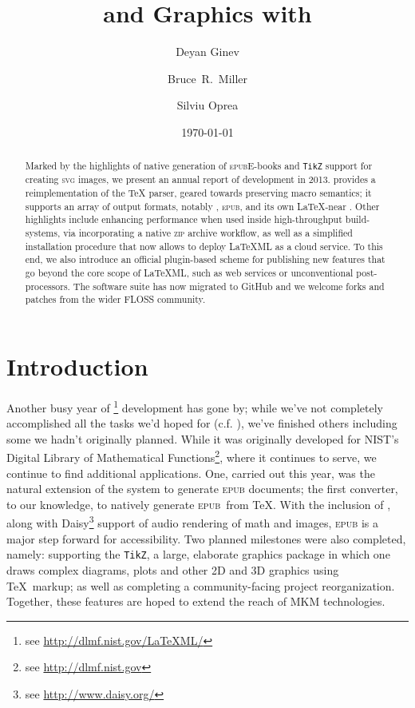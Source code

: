 \documentclass{llncs}
\title{\ebooks and Graphics with \LaTeXML}
\author{Deyan Ginev\inst{1} \and Bruce~R.~Miller\inst{2} \and Silviu Oprea\inst{3}}
\institute{Computer Science, Jacobs University Bremen, Germany
 \and National Institute of Standards and Technology, Gaithersburg, MD, USA
 \and Department of Computer Science, University of Oxford, Oxford, UK}
\date{\today}
\def\ebooks{\mbox{E-books}\xspace}
\def\epub{\textsc{epub}\xspace}
\def\svg{\textsc{svg}\xspace}
\def\zip{\textsc{zip}\xspace}
\def\tikz{\texttt{TikZ}\xspace}
\begin{document}
\maketitle
\begin{abstract} 
Marked by the highlights of native generation of \epub \ebooks and \tikz support for creating \svg images, we present an annual report of {\LaTeXML} development in 2013. {\LaTeXML} provides a reimplementation of the {\TeX} parser, geared towards preserving macro semantics;
it supports an array of output formats, notably , \epub, {\XHTML} and its own \LaTeX-near \XML.
Other highlights include enhancing performance when used inside high-throughput build-systems, via incorporating a native \zip archive workflow, as well as a simplified installation procedure that now allows to deploy LaTeXML as a cloud service. To this end, we also introduce an official plugin-based scheme for publishing new features that go beyond the core scope of LaTeXML, such as web services or unconventional post-processors.
The software suite has now migrated to GitHub and we welcome forks and patches from the wider FLOSS community.
\end{abstract}

\section{Introduction}
Another busy year of {\LaTeXML}\footnote{see \url{http://dlmf.nist.gov/LaTeXML/}} development has gone by;
while we've not completely accomplished all the tasks we'd hoped for (c.f. \cite{GinMil:latexmlCICM13}),
we've finished others including some we hadn't originally planned.
While it was originally developed for NIST's Digital Library of Mathematical Functions\footnote{see \url{http://dlmf.nist.gov}},
where it continues to serve, we continue to find additional applications.
One, carried out this year, was the natural extension of the system to generate \epub documents;
the first converter, to our knowledge, to natively generate \epub\ from \TeX.  
With the inclusion of \MathML, along with Daisy\footnote{see \url{http://www.daisy.org/}}
support of audio rendering of math and images, \epub is a major step forward for
accessibility. 
Two planned milestones were also completed, namely: supporting the \tikz, a large, elaborate
graphics package in which one draws complex diagrams, plots and other 2D and 3D graphics
using \TeX\ markup; as well as completing a community-facing project reorganization.
Together, these features are hoped to extend the reach of MKM technologies.
\end{document}

